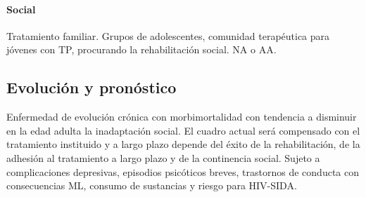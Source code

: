 \paragraph{Social}
Tratamiento familiar. Grupos de adolescentes, comunidad terapéutica para jóvenes con TP, procurando la rehabilitación social. NA o AA.
\subsection*{Evolución y pronóstico}
Enfermedad de evolución crónica con morbimortalidad con tendencia a disminuir en la edad adulta la inadaptación social. El cuadro actual será compensado con el tratamiento instituido y a largo plazo depende del éxito de la rehabilitación, de la adhesión al tratamiento a largo plazo y de la continencia social. Sujeto a complicaciones depresivas, episodios psicóticos breves, trastornos de conducta con consecuencias ML, consumo de sustancias y riesgo para HIV-SIDA.
\printbibliography
